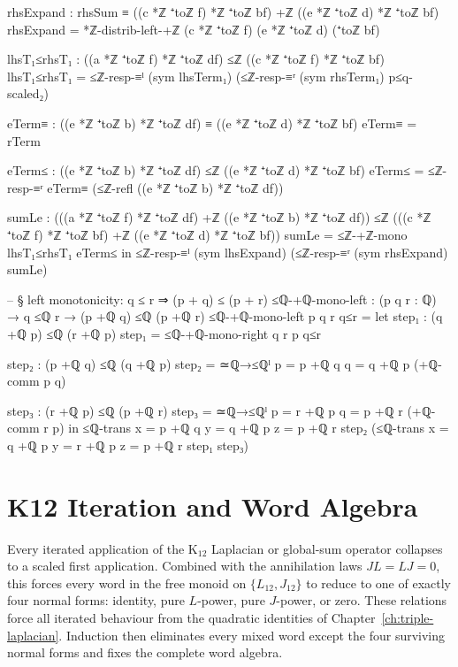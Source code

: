 \documentclass[11pt,a4paper]{book}
\def\texorpdfstring#1#2{#2}%
\begin{document}
\begin{code}
    rhsExpand : rhsSum ≡ ((c *ℤ ⁺toℤ f) *ℤ ⁺toℤ bf) +ℤ ((e *ℤ ⁺toℤ d) *ℤ ⁺toℤ bf)
    rhsExpand = *ℤ-distrib-left-+ℤ (c *ℤ ⁺toℤ f) (e *ℤ ⁺toℤ d) (⁺toℤ bf)

    lhsT₁≤rhsT₁ : ((a *ℤ ⁺toℤ f) *ℤ ⁺toℤ df) ≤ℤ ((c *ℤ ⁺toℤ f) *ℤ ⁺toℤ bf)
    lhsT₁≤rhsT₁ =
      ≤ℤ-resp-≡ˡ (sym lhsTerm₁) (≤ℤ-resp-≡ʳ (sym rhsTerm₁) p≤q-scaled₂)

    eTerm≡ : ((e *ℤ ⁺toℤ b) *ℤ ⁺toℤ df) ≡ ((e *ℤ ⁺toℤ d) *ℤ ⁺toℤ bf)
    eTerm≡ = rTerm

    eTerm≤ : ((e *ℤ ⁺toℤ b) *ℤ ⁺toℤ df) ≤ℤ ((e *ℤ ⁺toℤ d) *ℤ ⁺toℤ bf)
    eTerm≤ = ≤ℤ-resp-≡ʳ eTerm≡ (≤ℤ-refl ((e *ℤ ⁺toℤ b) *ℤ ⁺toℤ df))

    sumLe : (((a *ℤ ⁺toℤ f) *ℤ ⁺toℤ df) +ℤ ((e *ℤ ⁺toℤ b) *ℤ ⁺toℤ df)) ≤ℤ (((c *ℤ ⁺toℤ f) *ℤ ⁺toℤ bf) +ℤ ((e *ℤ ⁺toℤ d) *ℤ ⁺toℤ bf))
    sumLe = ≤ℤ-+ℤ-mono lhsT₁≤rhsT₁ eTerm≤
  in
  ≤ℤ-resp-≡ˡ (sym lhsExpand) (≤ℤ-resp-≡ʳ (sym rhsExpand) sumLe)

-- § left monotonicity: q ≤ r ⇒ (p + q) ≤ (p + r)
≤ℚ-+ℚ-mono-left : (p q r : ℚ) → q ≤ℚ r → (p +ℚ q) ≤ℚ (p +ℚ r)
≤ℚ-+ℚ-mono-left p q r q≤r =
  let
    step₁ : (q +ℚ p) ≤ℚ (r +ℚ p)
    step₁ = ≤ℚ-+ℚ-mono-right q r p q≤r

    step₂ : (p +ℚ q) ≤ℚ (q +ℚ p)
    step₂ = ≃ℚ→≤ℚˡ {p = p +ℚ q} {q = q +ℚ p} (+ℚ-comm p q)

    step₃ : (r +ℚ p) ≤ℚ (p +ℚ r)
    step₃ = ≃ℚ→≤ℚˡ {p = r +ℚ p} {q = p +ℚ r} (+ℚ-comm r p)
  in
  ≤ℚ-trans {x = p +ℚ q} {y = q +ℚ p} {z = p +ℚ r} step₂
    (≤ℚ-trans {x = q +ℚ p} {y = r +ℚ p} {z = p +ℚ r} step₁ step₃)
\end{code}


\chapter{K\texorpdfstring{$_{12}$}{12} Iteration and Word Algebra}
\label{ch:k12-iteration-words}

Every iterated application of the K$_{12}$ Laplacian or global-sum operator
collapses to a scaled first application.  Combined with the annihilation
laws $JL = LJ = 0$, this forces every word in the free monoid on
$\{L_{12}, J_{12}\}$ to reduce to one of exactly four normal forms: identity,
pure $L$-power, pure $J$-power, or zero.
These relations force all iterated behaviour from the quadratic identities of
Chapter~\ref{ch:triple-laplacian}.  Induction then eliminates every mixed word
except the four surviving normal forms and fixes the complete word algebra.
\end{document}
